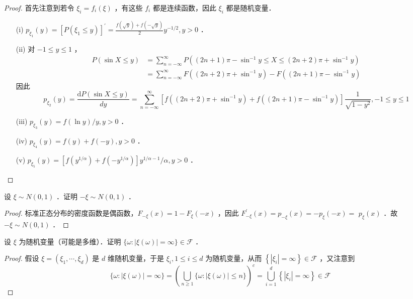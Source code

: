 \begin{proof}
    首先注意到若令 $\xi_i=f_i(\xi)$ ，有这些 $f_i$ 都是连续函数，因此 $\xi_i$ 都是随机变量．
    \begin{enumerate}
        \item[(i)] $p_{\xi_1}(y)=\left[P\left(\xi_1 \leq y\right)\right]^{\prime}=\frac{f(\sqrt{y})+f(-\sqrt{y})}{2} y^{-1 / 2}, y>0$ ．
        \item[(ii)] 对 $-1 \leq y \leq 1$ ，
            $$
                \begin{aligned}
                    P(\sin X \leq y) & =\sum_{n=-\infty}^{\infty} P\left((2 n+1) \pi-\sin ^{-1} y \leq X \leq(2 n+2) \pi+\sin ^{-1} y\right)    \\
                                     & =\sum_{n=-\infty}^{\infty} F\left((2 n+2) \pi+\sin ^{-1} y\right)-F\left((2 n+1) \pi-\sin ^{-1} y\right)
                \end{aligned}
            $$
            因此
            $$
                p_{\xi_2}(y)=\frac{\mathrm{d} P(\sin X \leq y)}{d y}=\sum_{n=-\infty}^{\infty}\left[f\left((2 n+2) \pi+\sin ^{-1} y\right)+f\left((2 n+1) \pi-\sin ^{-1} y\right)\right] \frac{1}{\sqrt{1-y^2}},-1 \leq y \leq 1
            $$
        \item[(iii)] $p_{\xi_3}(y)=f(\ln y) / y, y>0$ ．
        \item[(iv)] $p_{\xi_4}(y)=f(y)+f(-y), y>0$ ．
        \item[(v)] $p_{\xi_5}(y)=\left[f\left(y^{1 / \alpha}\right)+f\left(-y^{1 / \alpha}\right)\right] y^{1 / \alpha-1} / \alpha, y>0$ ．
    \end{enumerate}
\end{proof}
\begin{exercise}
    设 $\xi \sim N(0,1)$ ．证明 $-\xi \sim N(0,1)$ ．
\end{exercise}
\begin{proof}
    标准正态分布的密度函数是偶函数，$F_{-\xi}(x)=1-F_{\xi}(-x)$ ，因此 $F_{-\xi}^{\prime}(x)=p_{-\xi}(x)=-p_{\xi}(-x)=$ $p_{\xi}(x)$ ．故 $-\xi \sim N(0,1)$ ．
\end{proof}
\begin{exercise}
    设 $\xi$ 为随机变量（可能是多维）．证明 $\{\omega:|\xi(\omega)|=\infty\} \in \mathscr{F}$ ．
\end{exercise}
\begin{proof}
    假设 $\xi=\left(\xi_1, \cdots, \xi_d\right)$ 是 $d$ 维随机变量，于是 $\xi_i, 1 \leq i \leq d$ 为随机变量，从而 $\left\{\left|\xi_i\right|=\infty\right\} \in \mathscr{F}$ ，又注意到
    $$
        \{\omega:|\xi(\omega)|=\infty\}=\left(\bigcup_{n \geq 1}\{\omega:|\xi(\omega)| \leq n\}\right)^c=\bigcup_{i=1}^d\left\{\left|\xi_i\right|=\infty\right\} \in \mathscr{F}
    $$
\end{proof}
